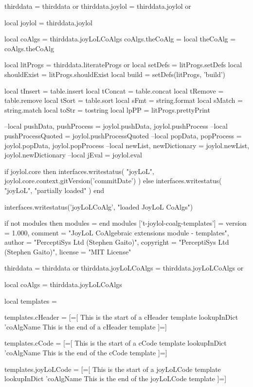 thirddata         = thirddata        or {}
thirddata.joylol  = thirddata.joylol or {}

local joylol      = thirddata.joylol

local coAlgs      = thirddata.joyLoLCoAlgs
coAlgs.theCoAlg   = {}
local theCoAlg    = coAlgs.theCoAlg

local litProgs    = thirddata.literateProgs or {}
local setDefs     = litProgs.setDefs
local shouldExist = litProgs.shouldExist
local build       = setDefs(litProgs, 'build')

local tInsert = table.insert
local tConcat = table.concat
local tRemove = table.remove
local tSort   = table.sort
local sFmt    = string.format
local sMatch  = string.match
local toStr   = tostring
local lpPP    = litProgs.prettyPrint

--local pushData, pushProcess = joylol.pushData, joylol.pushProcess
--local pushProcessQuoted = joylol.pushProcessQuoted
--local popData, popProcess   = joylol.popData, joylol.popProcess
--local newList, newDictionary = joylol.newList, joylol.newDictionary
--local jEval = joylol.eval

if joylol.core then
  interfaces.writestatus(
    "joyLoL",
    joylol.core.context.gitVersion('commitDate')
  )
else
  interfaces.writestatus(
    "joyLoL",
    "partially loaded"
  )
end

interfaces.writestatus('joyLoLCoAlg', "loaded JoyLoL CoAlgs")
\stopLuaCode

\startLuaTemplate
if not modules then modules = { } end modules ['t-joylol-coalg-templates'] = {
    version   = 1.000,
    comment   = "JoyLoL CoAlgebraic extensions module - templates",
    author    = "PerceptiSys Ltd (Stephen Gaito)",
    copyright = "PerceptiSys Ltd (Stephen Gaito)",
    license   = "MIT License"
}

thirddata              = thirddata              or {}
thirddata.joyLoLCoAlgs = thirddata.joyLoLCoAlgs or {}

local coAlgs     = thirddata.joyLoLCoAlgs

local templates  = { }

templates.cHeader = [=[
This is the start of a cHeader template
{{ lookupInDict 'coAlgName }}
This is the end of a cHeader template
]=]

templates.cCode = [=[
This is the start of a cCode template
{{ lookupInDict 'coAlgName }}
This is the end of the cCode template
]=]

templates.joyLoLCode = [=[
This is the start of a joyLoLCode template
{{ lookupInDict 'coAlgName }}
This is the end of the joyLoLCode template
]=]

